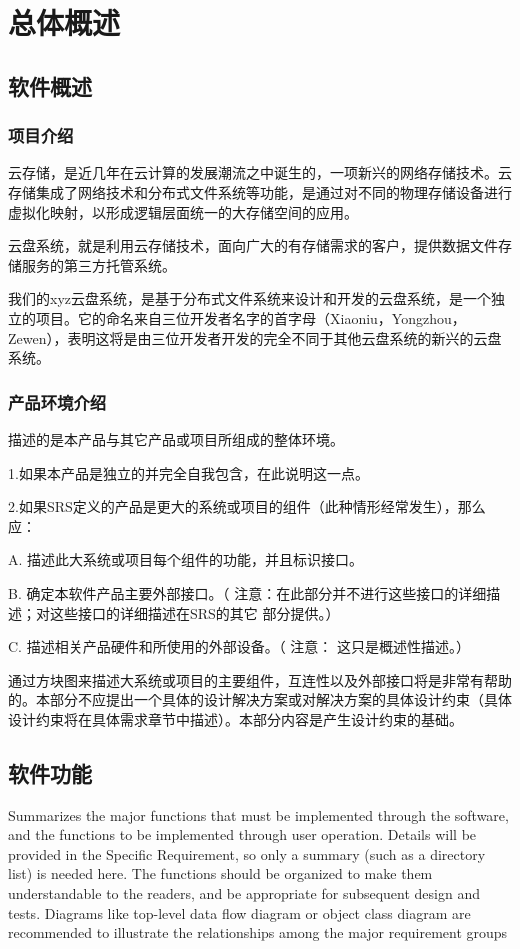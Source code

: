 \chapter{总体概述}

\section{软件概述}
\subsection{项目介绍}
云存储，是近几年在云计算的发展潮流之中诞生的，一项新兴的网络存储技术。云存储集成了网络技术和分布式文件系统等功能，是通过对不同的物理存储设备进行虚拟化映射，以形成逻辑层面统一的大存储空间的应用。

云盘系统，就是利用云存储技术，面向广大的有存储需求的客户，提供数据文件存储服务的第三方托管系统。

我们的xyz云盘系统，是基于分布式文件系统来设计和开发的云盘系统，是一个独立的项目。它的命名来自三位开发者名字的首字母（Xiaoniu，Yongzhou，Zewen），表明这将是由三位开发者开发的完全不同于其他云盘系统的新兴的云盘系统。

\subsection{产品环境介绍}

描述的是本产品与其它产品或项目所组成的整体环境。

1.如果本产品是独立的并完全自我包含，在此说明这一点。

2.如果SRS定义的产品是更大的系统或项目的组件（此种情形经常发生），那么应：

	A. 描述此大系统或项目每个组件的功能，并且标识接口。

	B.  确定本软件产品主要外部接口。（ 注意：在此部分并不进行这些接口的详细描述；对这些接口的详细描述在SRS的其它 部分提供。）
    
    C. 描述相关产品硬件和所使用的外部设备。（  注意：  这只是概述性描述。）

通过方块图来描述大系统或项目的主要组件，互连性以及外部接口将是非常有帮助的。本部分不应提出一个具体的设计解决方案或对解决方案的具体设计约束（具体设计约束将在具体需求章节中描述）。本部分内容是产生设计约束的基础。

\section{软件功能}
Summarizes the major functions that must be implemented through the software, and the functions to be implemented through user operation. Details will be provided in the Specific Requirement, so only a summary (such as a directory list) is needed here. The functions should be organized to make them understandable to the readers, and be appropriate for subsequent design and tests. Diagrams like top-level data flow diagram or object class diagram are recommended to illustrate the relationships among the major requirement groups 

